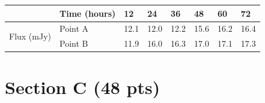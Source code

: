 \documentclass{exam}
\begin{document}
\begin{table}[h]
\centering
\setlength{\tabcolsep}{5pt}
\renewcommand{\arraystretch}{1.5}
\begin{tabular}{l|l|llllll}
                            & Time (hours) & 12   & 24   & 36   & 48   & 60   & 72   \\
                            \hline
\multirow{2}{*}{Flux (mJy)} & Point A      & 12.1 & 12.0 & 12.2 & 15.6 & 16.2 & 16.4 \\
                            & Point B      & 11.9 & 16.0 & 16.3 & 17.0 & 17.1 & 17.3
\end{tabular}
\end{table}

\newpage
\section*{Section C (48 pts)}
\end{document}
